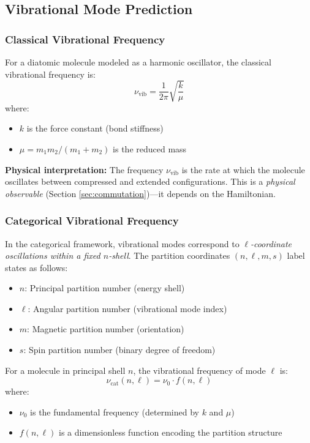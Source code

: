 \documentclass[twocolumn,10pt]{article}
\theoremstyle{remark}
\begin{document}
\subsection{Vibrational Mode Prediction}

\subsubsection{Classical Vibrational Frequency}

For a diatomic molecule modeled as a harmonic oscillator, the classical vibrational frequency is:
\begin{equation}
    \nu_{\text{vib}} = \frac{1}{2\pi}\sqrt{\frac{k}{\mu}}
    \label{eq:classical_vibration}
\end{equation}
where:
\begin{itemize}
    \item $k$ is the force constant (bond stiffness)
    \item $\mu = m_1 m_2/(m_1 + m_2)$ is the reduced mass
\end{itemize}

\textbf{Physical interpretation:} The frequency $\nu_{\text{vib}}$ is the rate at which the molecule oscillates between compressed and extended configurations. This is a \textit{physical observable} (Section \ref{sec:commutation})—it depends on the Hamiltonian.

\subsubsection{Categorical Vibrational Frequency}

In the categorical framework, vibrational modes correspond to \textit{$\ell$-coordinate oscillations within a fixed $n$-shell}. The partition coordinates $(n, \ell, m, s)$ label states as follows:
\begin{itemize}
    \item $n$: Principal partition number (energy shell)
    \item $\ell$: Angular partition number (vibrational mode index)
    \item $m$: Magnetic partition number (orientation)
    \item $s$: Spin partition number (binary degree of freedom)
\end{itemize}

For a molecule in principal shell $n$, the vibrational frequency of mode $\ell$ is:
\begin{equation}
    \nu_{\text{cat}}(n, \ell) = \nu_0 \cdot f(n, \ell)
    \label{eq:categorical_vibration}
\end{equation}
where:
\begin{itemize}
    \item $\nu_0$ is the fundamental frequency (determined by $k$ and $\mu$)
    \item $f(n, \ell)$ is a dimensionless function encoding the partition structure
\end{itemize}
\end{document}
